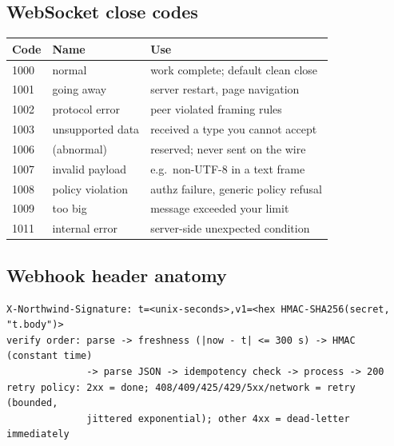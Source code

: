 \subsection*{WebSocket close codes}
\begin{table}[h]
  \centering
  \small
  \begin{tabularx}{\textwidth}{l l X}
    \toprule
    \textbf{Code} & \textbf{Name} & \textbf{Use} \\
    \midrule
    1000 & normal & work complete; default clean close \\
    1001 & going away & server restart, page navigation \\
    1002 & protocol error & peer violated framing rules \\
    1003 & unsupported data & received a type you cannot accept \\
    1006 & (abnormal) & reserved; never sent on the wire \\
    1007 & invalid payload & e.g.\ non-UTF-8 in a text frame \\
    1008 & policy violation & authz failure, generic policy refusal \\
    1009 & too big & message exceeded your limit \\
    1011 & internal error & server-side unexpected condition \\
    \bottomrule
  \end{tabularx}
\end{table}

\subsection*{Webhook header anatomy}
\begin{verbatim}
X-Northwind-Signature: t=<unix-seconds>,v1=<hex HMAC-SHA256(secret, "t.body")>
verify order: parse -> freshness (|now - t| <= 300 s) -> HMAC (constant time)
              -> parse JSON -> idempotency check -> process -> 200
retry policy: 2xx = done; 408/409/425/429/5xx/network = retry (bounded,
              jittered exponential); other 4xx = dead-letter immediately
\end{verbatim}


